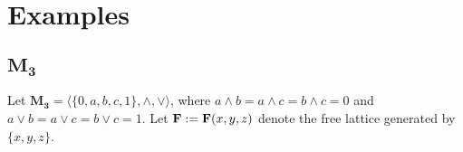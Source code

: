 




























  \appendix

\section{Examples}

\subsection{$\mathbf{M_3}$}

Let $\mathbf{M_3} = \langle \{0, a, b, c, 1\}, \wedge, \vee\rangle$, where $a \wedge b = a \wedge c = b \wedge c = 0$ and $a \vee b = a \vee c = b \vee c = 1.$ Let $\mathbf{F} := \mathbf{F}(x, y, z)$ denote the free lattice generated by $\{x, y, z\}$.

